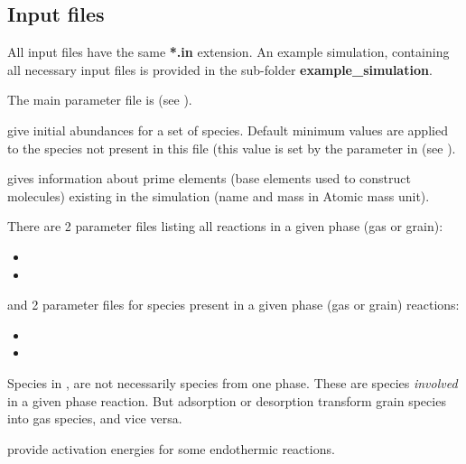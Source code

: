 \documentclass[english,a4paper,twoside]{article}
\begin{document}
\subsection{Input files}\label{sec:input-files}
All input files have the same \textbf{*.in} extension. An example simulation, containing all necessary input files is provided in the sub-folder \textbf{example\_simulation}.

The main parameter file is  (see ).

 give initial abundances for a set of species. Default minimum values are applied to the species not present in this file (this value is set by the parameter  in  (see ).

 gives information about prime elements (base elements used to construct molecules) existing in the simulation (name and mass in Atomic mass unit).

There are 2 parameter files listing all reactions in a given phase (gas or grain): 
\begin{itemize}
\item {}
\item {}
\end{itemize}
and 2 parameter files for species present in a given phase (gas or grain) reactions:
\begin{itemize}
\item {}
\item {}
\end{itemize}

\begin{remarque}
Species in ,  are not necessarily species from one phase. These are species \emph{involved} in a given phase reaction. But adsorption or desorption transform grain species into gas species, and vice versa. 
\end{remarque}

 provide activation energies for some endothermic reactions. 
\end{document}
